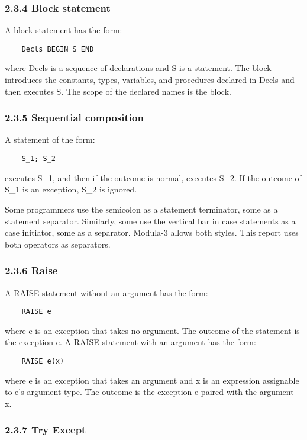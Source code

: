 \documentclass[10pt]{article}
\begin{document}
\subsubsection*{2.3.4 Block statement}

A block statement has the form:
\begin{verbatim}
    Decls BEGIN S END
\end{verbatim}
where Decls is a sequence of declarations and S is a statement.  The block
introduces the constants, types, variables, and procedures declared in Decls
and then executes S.  The scope of the declared names is the block.

\subsubsection*{2.3.5 Sequential composition}

A statement of the form:
\begin{verbatim}
    S_1; S_2
\end{verbatim}
executes S\_1, and then if the outcome is normal, executes S\_2.  If the
outcome of S\_1 is an exception, S\_2 is ignored.

Some programmers use the semicolon as a statement terminator, some as a
statement separator.  Similarly, some use the vertical bar in case statements
as a case initiator, some as a separator.  Modula-3 allows both styles.  This
report uses both operators as separators.

\subsubsection*{2.3.6 Raise}

A RAISE statement without an argument has the form:
\begin{verbatim}
    RAISE e
\end{verbatim}
where e is an exception that takes no argument.  The outcome of the statement
is the exception e.  A RAISE statement with an argument has the form:
\begin{verbatim}
    RAISE e(x)
\end{verbatim}
where e is an exception that takes an argument and x is an expression
assignable to e's argument type.  The outcome is the exception e paired with
the argument x.

\subsubsection*{2.3.7 Try Except}
\end{document}
